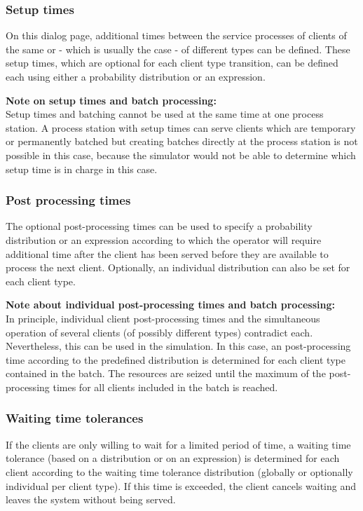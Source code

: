 \subsubsection*{Setup times}

On this dialog page, additional times between the service processes of clients of the same
or - which is usually the case - of different types can be defined. These setup times,
which are optional for each client type transition, can be defined each using either a
probability distribution or an expression.

\textbf{Note on setup times and batch processing:}~\\
Setup times and batching cannot be used at the same time at one process station.
A process station with setup times can serve clients which are temporary or
permanently batched but creating batches directly at the process station is
not possible in this case, because the simulator would not be able to determine
which setup time is in charge in this case.

\subsubsection*{Post processing times}

The optional post-processing times can be used to specify a probability distribution or an expression
according to which the operator will require additional time after the client has been served before they are
available to process the next client. Optionally, an individual distribution can also be set
for each client type.

\textbf{Note about individual post-processing times and batch processing:}~\\
In principle, individual client post-processing times and the simultaneous operation of several clients
(of possibly different types) contradict each. Nevertheless, this can be used in the simulation.
In this case, an post-processing time according to the predefined distribution is determined for each
client type contained in the batch. The resources are seized until the maximum of the post-processing times
for all clients included in the batch is reached.

\subsubsection*{Waiting time tolerances}

If the clients are only willing to wait for a limited period of time, a waiting time tolerance (based on a distribution
or on an expression) is determined for each client according to the waiting time tolerance distribution
(globally or optionally individual per client type). If this time is exceeded, the client cancels waiting and leaves
the system without being served.

